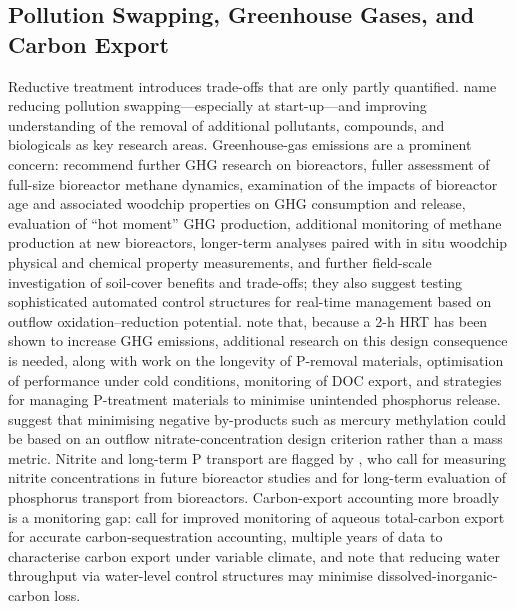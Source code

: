 \documentclass[11pt]{article}
\begin{document}
\subsection{Pollution Swapping, Greenhouse Gases, and Carbon Export}
Reductive treatment introduces trade-offs that are only partly quantified. \textcite{Christianson2021} name reducing pollution swapping---especially at start-up---and improving understanding of the removal of additional pollutants, compounds, and biologicals as key research areas. Greenhouse-gas emissions are a prominent concern: \textcite{Brunton2024} recommend further GHG research on bioreactors, fuller assessment of full-size bioreactor methane dynamics, examination of the impacts of bioreactor age and associated woodchip properties on GHG consumption and release, evaluation of ``hot moment'' GHG production, additional monitoring of methane production at new bioreactors, longer-term analyses paired with in situ woodchip physical and chemical property measurements, and further field-scale investigation of soil-cover benefits and trade-offs; they also suggest testing sophisticated automated control structures for real-time management based on outflow oxidation--reduction potential. \textcite{Strock2025} note that, because a 2-h HRT has been shown to increase GHG emissions, additional research on this design consequence is needed, along with work on the longevity of P-removal materials, optimisation of performance under cold conditions, monitoring of DOC export, and strategies for managing P-treatment materials to minimise unintended phosphorus release. \textcite{Maxwell2022} suggest that minimising negative by-products such as mercury methylation could be based on an outflow nitrate-concentration design criterion rather than a mass metric. Nitrite and long-term P transport are flagged by \textcite{Bell2015}, who call for measuring nitrite concentrations in future bioreactor studies and for long-term evaluation of phosphorus transport from bioreactors. Carbon-export accounting more broadly is a monitoring gap: \textcite{Schilling2023} call for improved monitoring of aqueous total-carbon export for accurate carbon-sequestration accounting, multiple years of data to characterise carbon export under variable climate, and note that reducing water throughput via water-level control structures may minimise dissolved-inorganic-carbon loss.
\end{document}
